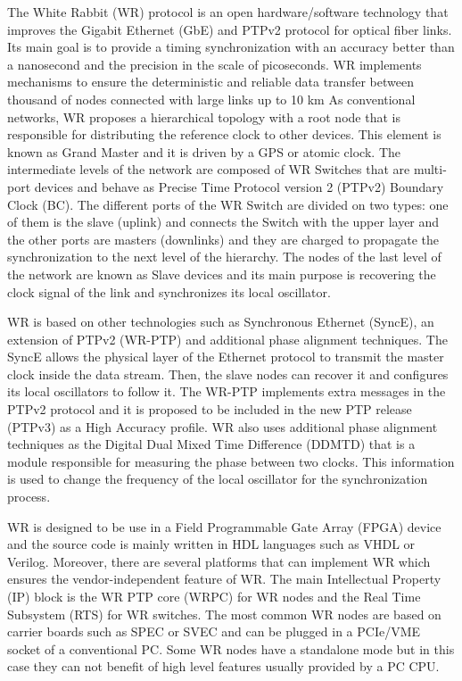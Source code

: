 \documentclass[review]{elsarticle}
\begin{document}
The White Rabbit (WR) protocol is an open hardware/software technology that improves the Gigabit Ethernet (GbE) and PTPv2 protocol for optical fiber links. Its main goal is to provide a timing synchronization with an accuracy better than a nanosecond and the precision in the scale of picoseconds. WR implements mechanisms to ensure the deterministic and reliable data transfer between thousand of nodes connected with large links up to 10 km As conventional networks, WR proposes a hierarchical topology with a root node that is responsible for distributing the reference clock to other devices. This element is known as Grand Master and it is driven by a GPS or atomic clock. The intermediate levels of the network are composed of WR Switches that are multi-port devices and behave as Precise Time Protocol version 2 (PTPv2) Boundary Clock (BC). The different ports of the WR Switch are divided on two types: one of them is the slave (uplink) and connects the Switch with the upper layer and the other ports are masters (downlinks) and they are charged to propagate the synchronization to the next level of the hierarchy. The nodes of the last level of the network are known as Slave devices and its main purpose is recovering the clock signal of the link and synchronizes its local oscillator.

WR is based on other technologies such as Synchronous Ethernet (SyncE), an extension of PTPv2 (WR-PTP) and additional phase alignment techniques. The SyncE allows the physical layer of the Ethernet protocol to transmit the master clock inside the data stream. Then, the slave nodes can recover it and configures its local oscillators to follow it. The WR-PTP implements extra messages in the PTPv2 protocol and it is proposed to be included in the new PTP release (PTPv3) as a High Accuracy profile. WR also uses additional phase alignment techniques as the Digital Dual Mixed Time Difference (DDMTD) that is a module responsible for measuring the phase between two clocks. This information is used to change the frequency of the local oscillator for the synchronization process.

WR is designed to be use in a Field Programmable Gate Array (FPGA) device and the source code is mainly written in HDL languages such as VHDL or Verilog. Moreover, there are several platforms that can implement WR which ensures the vendor-independent feature of WR. The main Intellectual Property (IP) block is the WR PTP core (WRPC) for WR nodes and the Real Time Subsystem (RTS) for WR switches. The most common WR nodes are based on carrier boards such as SPEC or SVEC and can be plugged in a PCIe/VME socket of a conventional PC. Some WR nodes have a standalone mode but in this case they can not benefit of high level features usually provided by a PC CPU.
\end{document}
